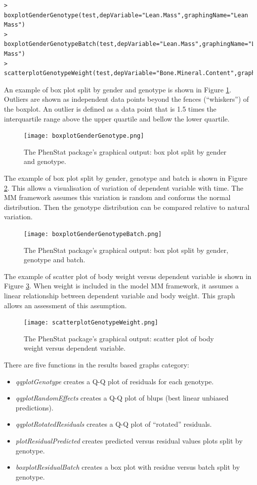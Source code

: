\documentclass[12pt,a4paper]{article}
\begin{document}
\begingroup
    \fontsize{8pt}{12pt}\selectfont
\begin{verbatim}
> boxplotGenderGenotype(test,depVariable="Lean.Mass",graphingName="Lean Mass")
> boxplotGenderGenotypeBatch(test,depVariable="Lean.Mass",graphingName="Lean Mass")
> scatterplotGenotypeWeight(test,depVariable="Bone.Mineral.Content",graphingName="BMC")
\end{verbatim}
\endgroup 

An example of box plot split by gender and genotype is shown in Figure \ref{fig:07}. Outliers are shown as independent data points beyond the fences (``whiskers'') of the boxplot. An outlier is defined as a data point that is 1.5 times the interquartile range above the upper quartile and bellow the lower quartile.
\begin{figure}[!htpb]%
\centerline{\texttt{[image: boxplotGenderGenotype.png]}}
\caption{The PhenStat package's graphical output: box plot split by gender and genotype.}\label{fig:07}
\end{figure}

The example of box plot split by gender, genotype and batch is shown in Figure \ref{fig:08}. This allows a visualisation of variation of dependent variable with time. The MM framework assumes this variation is random and conforms the normal distribution. Then the genotype distribution can be compared relative to natural variation. 
\begin{figure}[!htpb]%
\centerline{\texttt{[image: boxplotGenderGenotypeBatch.png]}}
\caption{The PhenStat package's graphical output: box plot split by gender, genotype and batch.}\label{fig:08}
\end{figure}

The example of scatter plot of body weight versus dependent variable is shown in Figure \ref{fig:09}. When weight is included in the model MM framework, it assumes a linear relationship between dependent variable and body weight. This graph allows an assessment of this assumption. 
\begin{figure}[!htpb]%
\centerline{\texttt{[image: scatterplotGenotypeWeight.png]}}
\caption{The PhenStat package's graphical output: scatter plot of body weight versus dependent variable.}\label{fig:09}
\end{figure}

There are five functions in the results based graphs category:
\begin{itemize}
\item \textit{qqplotGenotype} creates a Q-Q plot of residuals for each genotype.
\item \textit{qqplotRandomEffects} creates a Q-Q plot of blups (best linear unbiased predictions).
\item \textit{qqplotRotatedResiduals} creates a Q-Q plot of ``rotated'' residuals.
\item \textit{plotResidualPredicted} creates predicted versus residual values plots split by genotype.
\item \textit{boxplotResidualBatch} creates a box plot with residue versus batch split by genotype.
\end{itemize}
\end{document}
